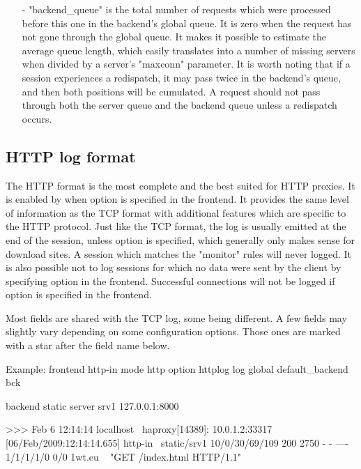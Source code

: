 \begin{itemize}
\item[-]
    "backend\_queue" is the total number of requests which were processed before
    this one in the backend's global queue. It is zero when the request has not
    gone through the global queue. It makes it possible to estimate the average
    queue length, which easily translates into a number of missing servers when
    divided by a server's "maxconn" parameter. It is worth noting that if a
    session experiences a redispatch, it may pass twice in the backend's queue,
    and then both positions will be cumulated. A request should not pass
    through both the server queue and the backend queue unless a redispatch
    occurs.
\end{itemize}

\subsection{HTTP log format}
\label{subsec:http_log_format}

The HTTP format is the most complete and the best suited for HTTP proxies. It
is enabled by when option  is specified in the frontend. It provides
the same level of information as the TCP format with additional features which
are specific to the HTTP protocol. Just like the TCP format, the log is usually
emitted at the end of the session, unless option  is specified, which
generally only makes sense for download sites. A session which matches the
"monitor" rules will never logged. It is also possible not to log sessions for
which no data were sent by the client by specifying option  in the
frontend. Successful connections will not be logged if option 
is specified in the frontend.

Most fields are shared with the TCP log, some being different. A few fields may
slightly vary depending on some configuration options. Those ones are marked
with a star \chr{*} after the field name below.

  \begin{example}{Example:}
        frontend http-in
            mode http
            option httplog
            log global
            default_backend bck

        backend static
            server srv1 127.0.0.1:8000

    >>> Feb  6 12:14:14 localhost \
          haproxy[14389]: 10.0.1.2:33317 [06/Feb/2009:12:14:14.655] http-in \
          static/srv1 10/0/30/69/109 200 2750 - - ---- 1/1/1/1/0 0/0 {1wt.eu} \
          {} "GET /index.html HTTP/1.1"
\end{example}

